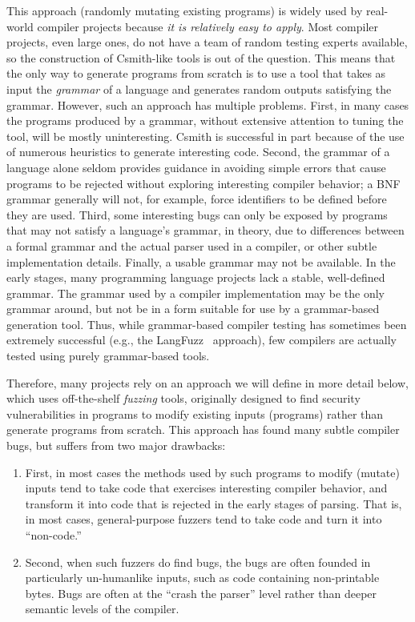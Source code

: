 This approach (randomly mutating existing programs) is widely used by
real-world compiler projects because \emph{it is relatively easy to
  apply}.  Most compiler projects, even large ones, do not have a team
of random testing experts available, so the construction of
Csmith-like tools is out of the question.  This means that the only
way to generate programs from scratch is to use a tool that takes as
input the \emph{grammar} of a language and generates random outputs
satisfying the grammar.   However, such an approach has multiple problems.
First, in many cases the programs produced by a grammar, without
extensive attention to tuning the tool, will be mostly uninteresting.
Csmith is successful in part because of the use of numerous heuristics
to generate interesting code.  Second, the grammar of a language alone
seldom provides guidance in avoiding simple errors that cause programs
to be rejected without exploring interesting compiler behavior; a BNF
grammar generally will not, for example, force identifiers to be
defined before they are used.  Third, some interesting bugs can only
be exposed by programs that may not satisfy a language's grammar, in
theory, due to differences between a formal grammar and the actual
parser used in a compiler, or other subtle implementation details.
Finally, a usable grammar may not be available.  In the early stages,
many programming language projects lack a stable, well-defined
grammar.  The grammar used by a compiler implementation may be the
only grammar around, but not be in a form suitable for use by a
grammar-based generation tool.  Thus, while grammar-based compiler
testing has sometimes been extremely successful (e.g., the
LangFuzz~\cite{LangFuzz} approach), few compilers are actually tested
using purely grammar-based tools.

Therefore, many projects rely on an approach we will define in more
detail below, which uses off-the-shelf \emph{fuzzing} tools,
originally designed to find security vulnerabilities in programs to
modify existing inputs (programs) rather than generate programs from
scratch.  This approach has found many subtle compiler bugs, but
suffers from two major drawbacks:

\begin{enumerate}
\item First, in most cases the methods used by such programs to modify
  (mutate) inputs tend to take code that exercises interesting
  compiler behavior, and transform it into code that is rejected in
  the early stages of parsing.  That is, in most cases,
  general-purpose fuzzers tend to take code and turn it into
  ``non-code.''
  \item Second, when such fuzzers do find bugs, the bugs are often
    founded in particularly un-humanlike inputs, such as code
    containing non-printable bytes.  Bugs are often at the ``crash the
    parser'' level rather than deeper semantic levels of the compiler.
  \end{enumerate}

